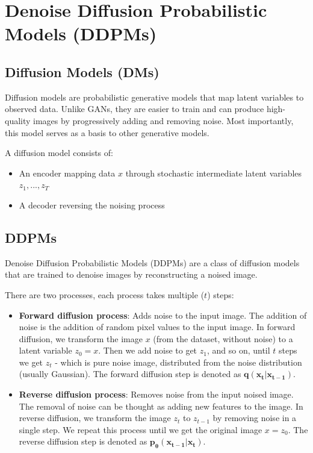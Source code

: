 \section{Denoise Diffusion Probabilistic Models (DDPMs)}


\subsection{Diffusion Models (DMs)}
\label{subsec:diffusion_models}

Diffusion models are probabilistic generative models that map latent variables to observed data. Unlike GANs, they are easier to train and can produce high-quality images by progressively adding and removing noise. Most importantly, this model serves as a basis to other generative models.

A diffusion model consists of:

\begin{itemize}
    \item An encoder mapping data $x$ through stochastic intermediate latent variables $z_1, ..., z_T$
    \item A decoder reversing the noising process
\end{itemize}





\subsection{DDPMs}
\label{sec:ddpm}

Denoise Diffusion Probabilistic Models (DDPMs) \cite{ddpm} are a class of diffusion models that are trained to denoise images by reconstructing a noised image. 

There are two processes, each process takes multiple ($t$) steps:

\begin{itemize}
    \item \textbf{Forward diffusion process}: Adds noise to the input image. The addition of noise is the addition of random pixel values to the input image. In forward diffusion, we transform the image $x$ (from the dataset, without noise) to a latent variable $z_0 = x$. Then we add noise to get $z_1$, and so on, until $t$ steps we get $z_t$ - which is pure noise image, distributed from the noise distribution (usually Gaussian). The forward diffusion step is denoted as $\mathbf{q(x_t | x_{t-1})}$.
    
    \item \textbf{Reverse diffusion process}: Removes noise from the input noised image. The removal of noise can be thought as adding new features to the image. In reverse diffusion, we transform the image $z_t$ to $z_{t-1}$ by removing noise in a single step. We repeat this process until we get the original image $x = z_0$. The reverse diffusion step is denoted as $\mathbf{p_\theta (x_{t-1} | x_t)}$.
\end{itemize}

